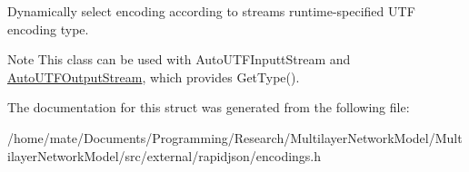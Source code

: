 Dynamically select encoding according to stream\textquotesingle{}s runtime-\/specified U\+TF encoding type. 

\begin{DoxyNote}{Note}
This class can be used with Auto\+U\+T\+F\+Inputt\+Stream and \hyperlink{classAutoUTFOutputStream}{Auto\+U\+T\+F\+Output\+Stream}, which provides Get\+Type(). 
\end{DoxyNote}


The documentation for this struct was generated from the following file\+:\begin{DoxyCompactItemize}
\item 
/home/mate/\+Documents/\+Programming/\+Research/\+Multilayer\+Network\+Model/\+Multilayer\+Network\+Model/src/external/rapidjson/encodings.\+h\end{DoxyCompactItemize}
